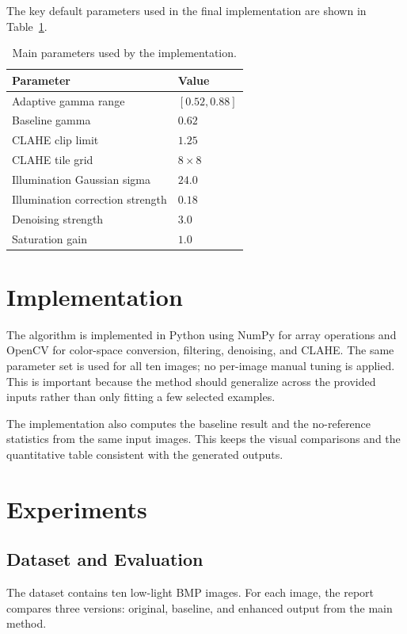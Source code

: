 \documentclass[11pt,a4paper]{article}
\begin{document}
The key default parameters used in the final implementation are shown in Table~\ref{tab:params}.

\begin{table}[H]
  \centering
  \caption{Main parameters used by the implementation.}
  \label{tab:params}
  \begin{tabular}{ll}
    \toprule
    Parameter & Value \\
    \midrule
    Adaptive gamma range & $[0.52, 0.88]$ \\
    Baseline gamma & $0.62$ \\
    CLAHE clip limit & $1.25$ \\
    CLAHE tile grid & $8 \times 8$ \\
    Illumination Gaussian sigma & $24.0$ \\
    Illumination correction strength & $0.18$ \\
    Denoising strength & $3.0$ \\
    Saturation gain & $1.0$ \\
    \bottomrule
  \end{tabular}
\end{table}

\section{Implementation}

The algorithm is implemented in Python using NumPy for array operations and OpenCV for color-space conversion, filtering, denoising, and CLAHE. The same parameter set is used for all ten images; no per-image manual tuning is applied. This is important because the method should generalize across the provided inputs rather than only fitting a few selected examples.

The implementation also computes the baseline result and the no-reference statistics from the same input images. This keeps the visual comparisons and the quantitative table consistent with the generated outputs.

\section{Experiments}

\subsection{Dataset and Evaluation}

The dataset contains ten low-light BMP images. For each image, the report compares three versions: original, baseline, and enhanced output from the main method.
\end{document}
